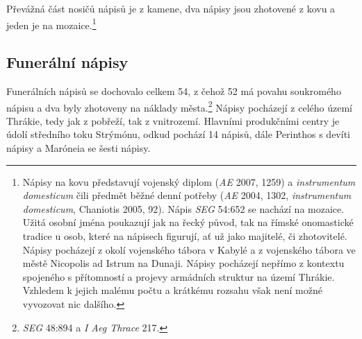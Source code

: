 Převážná část nosičů nápisů je z kamene, dva nápisy jsou zhotovené z kovu a jeden je na mozaice.\footnote{Nápisy na kovu představují vojenský diplom ({\em AE} 2007, 1259) a {\em instrumentum domesticum} čili předmět běžné denní potřeby ({\em AE} 2004, 1302, {\em instrumentum domesticum}, Chaniotis 2005, 92). Nápis {\em SEG} 54:652 se nachází na mozaice. Užitá osobní jména poukazují jak na řecký původ, tak na římské onomastické tradice u osob, které na nápisech figurují, ať už jako majitelé, či zhotovitelé. Nápisy pocházejí z okolí vojenského tábora v Kabylé a z vojenského tábora ve městě Nicopolis ad Istrum na Dunaji. Nápisy pocházejí nepřímo z kontextu spojeného s přítomností a projevy armádních struktur na území Thrákie. Vzhledem k jejich malému počtu a krátkému rozsahu však není možné vyvozovat nic dalšího.}

\subsection[funerální-nápisy-14]{Funerální nápisy}

Funerálních nápisů se dochovalo celkem 54, z čehož 52 má povahu soukromého nápisu a dva byly zhotoveny na náklady města.\footnote{{\em SEG} 48:894 a {\em I Aeg Thrace} 217.} Nápisy pocházejí z celého území Thrákie, tedy jak z pobřeží, tak z vnitrozemí. Hlavními produkčními centry je údolí středního toku Strýmónu, odkud pochází 14 nápisů, dále Perinthos s devíti nápisy a Maróneia se šesti nápisy.

